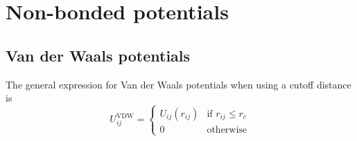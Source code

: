 \section{Non-bonded potentials}

\subsection{Van der Waals potentials}

The general expression for Van der Waals potentials when using a cutoff distance is
\begin{equation}
 U_{ij}^{\text{VDW}}=\begin{cases}
    U_{ij}\left(r_{ij}\right)& \text{if }r_{ij}\leq r_c\\
    0 & \text{otherwise}
   \end{cases}
\end{equation}

